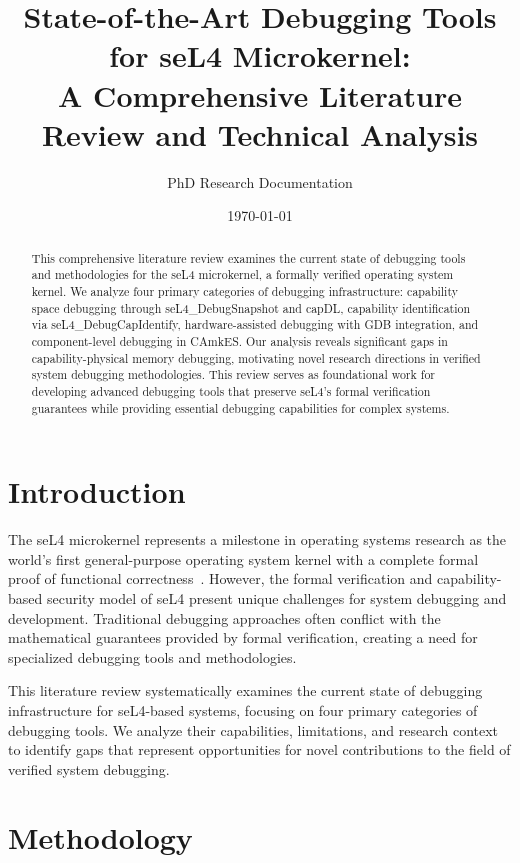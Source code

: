 \documentclass[11pt,a4paper]{article}
\title{State-of-the-Art Debugging Tools for seL4 Microkernel: \\
A Comprehensive Literature Review and Technical Analysis}
\author{PhD Research Documentation}
\date{\today}
\begin{document}
\maketitle

\begin{abstract}
This comprehensive literature review examines the current state of debugging tools and methodologies for the seL4 microkernel, a formally verified operating system kernel. We analyze four primary categories of debugging infrastructure: capability space debugging through seL4\_DebugSnapshot and capDL, capability identification via seL4\_DebugCapIdentify, hardware-assisted debugging with GDB integration, and component-level debugging in CAmkES. Our analysis reveals significant gaps in capability-physical memory debugging, motivating novel research directions in verified system debugging methodologies. This review serves as foundational work for developing advanced debugging tools that preserve seL4's formal verification guarantees while providing essential debugging capabilities for complex systems.
\end{abstract}

\tableofcontents

\section{Introduction}

The seL4 microkernel represents a milestone in operating systems research as the world's first general-purpose operating system kernel with a complete formal proof of functional correctness~\cite{Klein2009sel4}. However, the formal verification and capability-based security model of seL4 present unique challenges for system debugging and development. Traditional debugging approaches often conflict with the mathematical guarantees provided by formal verification, creating a need for specialized debugging tools and methodologies.

This literature review systematically examines the current state of debugging infrastructure for seL4-based systems, focusing on four primary categories of debugging tools. We analyze their capabilities, limitations, and research context to identify gaps that represent opportunities for novel contributions to the field of verified system debugging.

\section{Methodology}
\end{document}
